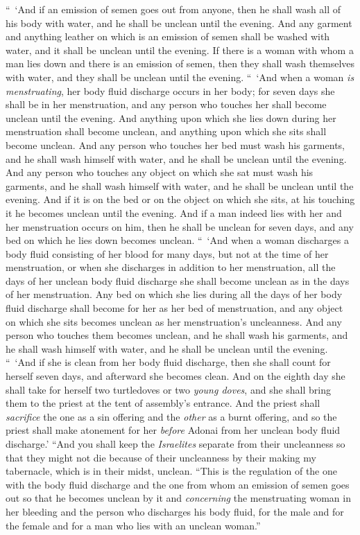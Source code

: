 \begin{biblechapter}
\verse “ ‘And if an emission of semen goes out from anyone, then he shall wash all of his body with water, and he shall be unclean until the evening.
\verse And any garment and anything leather on which is an emission of semen shall be washed with water, and it shall be unclean until the evening.
\verse If there is a woman with whom a man lies down and there is an emission of semen, then they shall wash themselves with water, and they shall be unclean until the evening.
\verse “ ‘And when a woman \textit{is menstruating}, her body fluid discharge occurs in her body; for seven days she shall be in her menstruation, and any person who touches her shall become unclean until the evening.
\verse And anything upon which she lies down during her menstruation shall become unclean, and anything upon which she sits shall become unclean.
\verse And any person who touches her bed must wash his garments, and he shall wash himself with water, and he shall be unclean until the evening.
\verse And any person who touches any object on which she sat must wash his garments, and he shall wash himself with water, and he shall be unclean until the evening.
\verse And if it is on the bed or on the object on which she sits, at his touching it he becomes unclean until the evening.
\verse And if a man indeed lies with her and her menstruation occurs on him, then he shall be unclean for seven days, and any bed on which he lies down becomes unclean.
\verse “ ‘And when a woman discharges a body fluid consisting of her blood for many days, but not at the time of her menstruation, or when she discharges in addition to her menstruation, all the days of her unclean body fluid discharge she shall become unclean as in the days of her menstruation.
\verse Any bed on which she lies during all the days of her body fluid discharge shall become for her as her bed of menstruation, and any object on which she sits becomes unclean as her menstruation’s uncleanness.
\verse And any person who touches them becomes unclean, and he shall wash his garments, and he shall wash himself with water, and he shall be unclean until the evening.
\verse “ ‘And if she is clean from her body fluid discharge, then she shall count for herself seven days, and afterward she becomes clean.
\verse And on the eighth day she shall take for herself two turtledoves or two \textit{young doves}, and she shall bring them to the priest at the tent of assembly’s entrance.
\verse And the priest shall \textit{sacrifice} the one as a sin offering and the \textit{other} as a burnt offering, and so the priest shall make atonement for her \textit{before} Adonai from her unclean body fluid discharge.’
\verse “And you shall keep the \textit{Israelites} separate from their uncleanness so that they might not die because of their uncleanness by their making my tabernacle, which is in their midst, unclean.
\verse “This is the regulation of the one with the body fluid discharge and the one from whom an emission of semen goes out so that he becomes unclean by it
\verse and \textit{concerning} the menstruating woman in her bleeding and the person who discharges his body fluid, for the male and for the female and for a man who lies with an unclean woman.”
\end{biblechapter}

